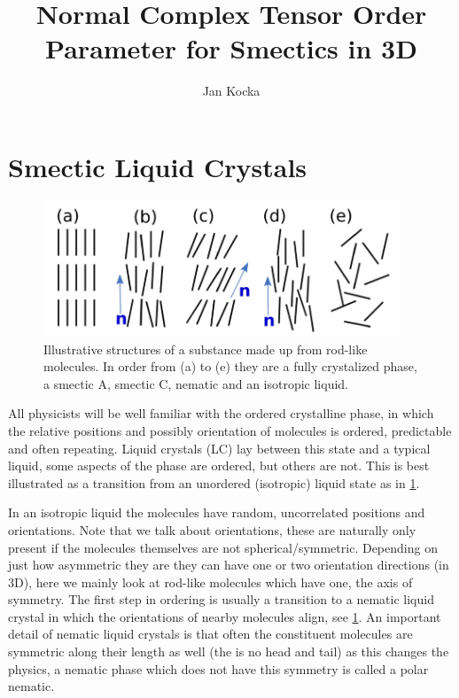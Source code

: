 \documentclass[12pt]{article}
\begin{document}
\title{Normal Complex Tensor Order Parameter for Smectics in 3D}
\author{Jan Kocka}

\begin{abstract}
    \lipsum[10]
\end{abstract}

\maketitle

\personalstatement
\acknowledgments

\maintext

\section{Smectic Liquid Crystals}
\begin{figure}[t]
    \begin{center}
        \includegraphics[width=0.95\textwidth]{figures/phases.pdf}
    \end{center}
    \caption{
        Illustrative structures of a substance made up from rod-like molecules.
        In order from (a) to (e) they are a fully crystalized phase, a smectic A, smectic C, nematic and an isotropic liquid.
    }\label{fig:phases}
\end{figure}
All physicists will be well familiar with the ordered crystalline phase, in which the relative positions and possibly orientation of molecules is ordered, predictable and often repeating.
Liquid crystals (LC) lay between this state and a typical liquid, some aspects of the phase are ordered, but others are not.
This is best illustrated as a transition from an unordered (isotropic) liquid state as in \cref{fig:phases}.

In an isotropic liquid the molecules have random, uncorrelated positions and orientations.
Note that we talk about orientations, these are naturally only present if the molecules themselves are not spherical/symmetric.
Depending on just how asymmetric they are they can have one or two orientation directions (in 3D), here we mainly look at rod-like molecules which have one, the axis of symmetry.
The first step in ordering is usually a transition to a nematic liquid crystal in which the orientations of nearby molecules align, see \cref{fig:phases}.
An important detail of nematic liquid crystals is that often the constituent molecules are symmetric along their length as well (the is no head and tail) as this changes the physics, a nematic phase which does not have this symmetry is called a polar nematic.
\end{document}
